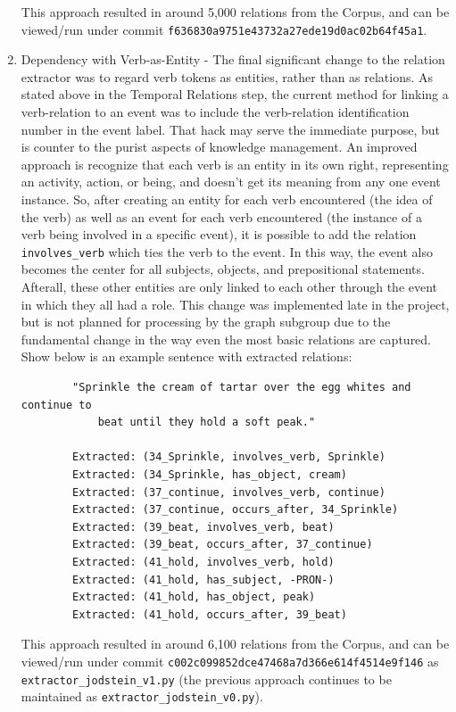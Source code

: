 \documentclass[11pt,letterpaper]{article}
\begin{document}
\begin{enumerate}
    This approach resulted in around 5,000 relations from the Corpus, and can be viewed/run under commit \texttt{f636830a9751e43732a27ede19d0ac02b64f45a1}.
    
    \item Dependency with Verb-as-Entity - The final significant change to the relation extractor was to regard verb tokens as entities, rather than as relations.  As stated above in the Temporal Relations step, the current method for linking a verb-relation to an event was to include the verb-relation identification number in the event label.  That hack may serve the immediate purpose, but is counter to the purist aspects of knowledge management.  An improved approach is recognize that each verb is an entity in its own right, representing an activity, action, or being, and doesn't get its meaning from any one event instance.  So, after creating an entity for each verb encountered (the idea of the verb) as well as an event for each verb encountered (the instance of a verb being involved in a specific event), it is possible to add the relation \texttt{involves\_verb} which ties the verb to the event.  In this way, the event also becomes the center for all subjects, objects, and prepositional statements.  Afterall, these other entities are only linked to each other through the event in which they all had a role.  This change was implemented late in the project, but is not planned for processing by the graph subgroup due to the fundamental change in the way even the most basic relations are captured.  Show below is an example sentence with extracted relations:
    
    \begin{verbatim}
        "Sprinkle the cream of tartar over the egg whites and continue to 
            beat until they hold a soft peak."
            
        Extracted: (34_Sprinkle, involves_verb, Sprinkle) 
        Extracted: (34_Sprinkle, has_object, cream)
        Extracted: (37_continue, involves_verb, continue)
        Extracted: (37_continue, occurs_after, 34_Sprinkle)
        Extracted: (39_beat, involves_verb, beat)
        Extracted: (39_beat, occurs_after, 37_continue)
        Extracted: (41_hold, involves_verb, hold)
        Extracted: (41_hold, has_subject, -PRON-)
        Extracted: (41_hold, has_object, peak)
        Extracted: (41_hold, occurs_after, 39_beat)
    \end{verbatim}
    
    
    This approach resulted in around 6,100 relations from the Corpus, and can be viewed/run under commit \texttt{c002c099852dce47468a7d366e614f4514e9f146} as \texttt{extractor\_jodstein\_v1.py} (the previous approach continues to be maintained as \texttt{extractor\_jodstein\_v0.py}).

\end{enumerate}
\end{document}

